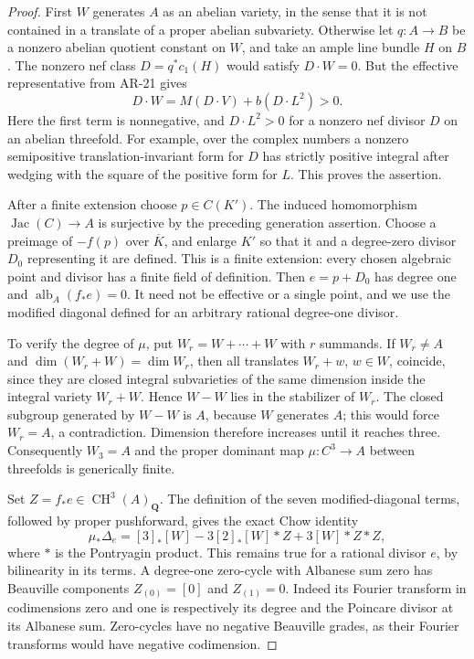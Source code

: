\begin{proof}
First $W$ generates $A$ as an abelian variety, in the sense that it
is not contained in a translate of a proper abelian subvariety.
Otherwise let $q:A\to B$ be a nonzero abelian quotient constant on
$W$, and take an ample line bundle $H$ on $B$.  The nonzero nef class
$D=q^*c_1(H)$ would satisfy $D\cdot W=0$.  But the effective
representative from AR-21 gives
\[
 D\cdot W=M(D\cdot V)+b(D\cdot L^2)>0.
\]
Here the first term is nonnegative, and $D\cdot L^2>0$ for a nonzero
nef divisor $D$ on an abelian threefold.  For example, over the
complex numbers a nonzero semipositive translation-invariant form
for $D$ has strictly positive integral after wedging with the square
of the positive form for $L$.  This proves the assertion.

After a finite extension choose $p\in C(K')$.  The induced homomorphism
$\operatorname{Jac}(C)\to A$ is surjective by the preceding
generation assertion.  Choose a preimage of $-f(p)$ over
$\overline K$, and enlarge $K'$ so that it and a degree-zero divisor
$D_0$ representing it are defined.  This is a finite extension:
every chosen algebraic point and divisor has a finite field of
definition.  Then $e=p+D_0$ has degree one and
$\operatorname{alb}_A(f_*e)=0$.  It need not be effective or a
single point, and we use the modified diagonal defined for an
arbitrary rational degree-one divisor.

To verify the degree of $\mu$, put $W_r=W+\cdots+W$ with $r$ summands.
If $W_r\ne A$ and $\dim(W_r+W)=\dim W_r$, then all translates
$W_r+w$, $w\in W$, coincide, since they are closed integral
subvarieties of the same dimension inside the integral variety
$W_r+W$.  Hence $W-W$ lies in the stabilizer of $W_r$.  The closed
subgroup generated by $W-W$ is $A$, because $W$ generates $A$;
this would force $W_r=A$, a contradiction.  Dimension therefore
increases until it reaches three.  Consequently $W_3=A$ and the
proper dominant map $\mu:C^3\to A$ between threefolds is
generically finite.

Set $Z=f_*e\in\operatorname{CH}^3(A)_\mathbf Q$.  The definition of
the seven modified-diagonal terms, followed by proper pushforward,
gives the exact Chow identity
\[
 \mu_*\Delta_e=[3]_*[W]
            -3[2]_*[W]*Z+3[W]*Z*Z,                    \tag{AR.24d}
\]
where $*$ is the Pontryagin product.  This remains true for a
rational divisor $e$, by bilinearity in its terms.  A degree-one
zero-cycle with Albanese sum zero has Beauville components
$Z_{(0)}=[0]$ and $Z_{(1)}=0$.  Indeed its Fourier transform in
codimensions zero and one is respectively its degree and the
Poincare divisor at its Albanese sum.  Zero-cycles have no negative
Beauville grades, as their Fourier transforms would have negative
codimension.


\end{proof}
